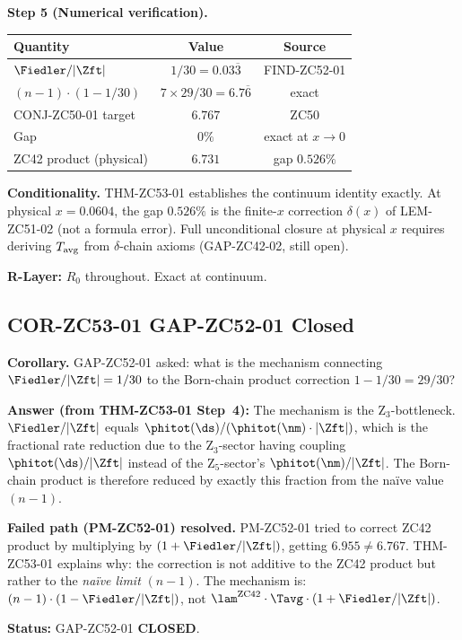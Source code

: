 \documentclass[12pt, a4paper]{article}
\begin{document}
\begin{formalbox}[title={THM-ZC53-01: Bottleneck Bridge Theorem
  ($R_0$, Conditional)}]
\textbf{Step 5 (Numerical verification).}
\begin{center}
\begin{tabular}{@{}lcc@{}}
\toprule
Quantity & Value & Source \\
\midrule
$\Fiedler/|\Zft|$ & $1/30 = 0.03\overline{3}$ & FIND-ZC52-01 \\
$(n-1)\cdot(1-1/30)$ & $7\times 29/30 = 6.7\overline{6}$ & exact \\
CONJ-ZC50-01 target & $6.767$ & ZC50 \\
Gap & $0\%$ & exact at $x\to 0$ \\
ZC42 product (physical) & $6.731$ & gap $0.526\%$ \\
\bottomrule
\end{tabular}
\end{center}

\textbf{Conditionality.}
THM-ZC53-01 establishes the continuum identity exactly.
At physical $x = 0.0604$, the gap $0.526\%$ is the
finite-$x$ correction $\delta(x)$ of LEM-ZC51-02
(not a formula error). Full unconditional closure at
physical $x$ requires deriving $T_{\rm avg}$ from
$\delta$-chain axioms (GAP-ZC42-02, still open).

\textbf{R-Layer:} $R_0$ throughout. Exact at continuum.
\end{formalbox}

\subsection{COR-ZC53-01 \quad GAP-ZC52-01 Closed}
\label{zc53:sec:cor01}


\begin{formalbox}[title={COR-ZC53-01: GAP-ZC52-01 Closed ($R_0$)}]
\textbf{Corollary.}
GAP-ZC52-01 asked: what is the mechanism connecting
$\Fiedler/|\Zft| = 1/30$ to the Born-chain product
correction $1 - 1/30 = 29/30$?

\textbf{Answer (from THM-ZC53-01 Step~4):}
The mechanism is the Z$_3$-bottleneck.
$\Fiedler/|\Zft|$ equals $\phitot(\ds)/(\phitot(\nm)\cdot|\Zft|)$,
which is the fractional rate reduction due to the Z$_3$-sector
having coupling $\phitot(\ds)/|\Zft|$ instead of the
Z$_5$-sector's $\phitot(\nm)/|\Zft|$.
The Born-chain product is therefore reduced by exactly this
fraction from the na\"{i}ve value $(n-1)$.

\textbf{Failed path (PM-ZC52-01) resolved.}
PM-ZC52-01 tried to correct ZC42 product by multiplying
by $(1 + \Fiedler/|\Zft|)$, getting $6.955 \neq 6.767$.
THM-ZC53-01 explains why: the correction is not additive
to the ZC42 product but rather to the \emph{na\"{i}ve limit}
$(n-1)$. The mechanism is:
$(n-1)\cdot(1 - \Fiedler/|\Zft|)$, not
$\lam^{\rm ZC42}\cdot\Tavg\cdot(1 + \Fiedler/|\Zft|)$.

\textbf{Status:} GAP-ZC52-01 \textbf{CLOSED}.
\end{formalbox}
\end{document}
